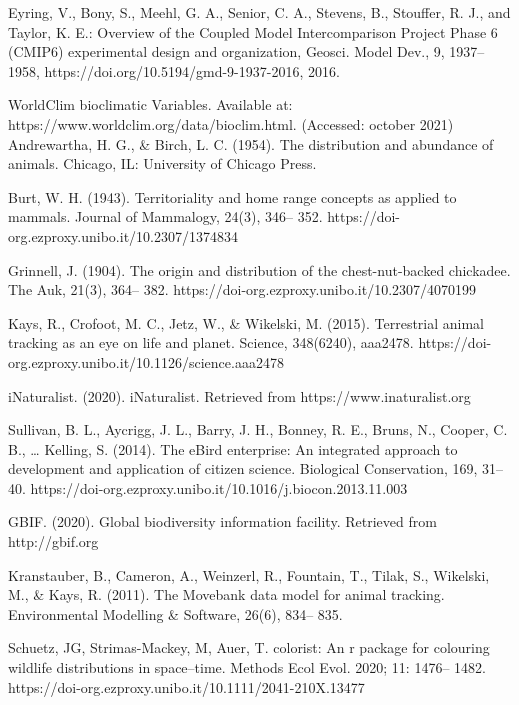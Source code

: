 \documentclass[12pt,a4paper]{article}
\begin{document}
\begin{thebibliography}{999}
Eyring, V., Bony, S., Meehl, G. A., Senior, C. A., Stevens, B., Stouffer, R. J., and Taylor, K. E.: Overview of the Coupled Model Intercomparison Project Phase 6 (CMIP6) experimental design and organization, Geosci. Model Dev., 9, 1937–1958, https://doi.org/10.5194/gmd-9-1937-2016, 2016.

WorldClim bioclimatic Variables. Available at: https://www.worldclim.org/data/bioclim.html. (Accessed: october 2021)
Andrewartha, H. G., \& Birch, L. C. (1954). The distribution and abundance of animals. Chicago, IL: University of Chicago Press.

Burt, W. H. (1943). Territoriality and home range concepts as applied to mammals. Journal of Mammalogy, 24(3), 346– 352. https://doi-org.ezproxy.unibo.it/10.2307/1374834

Grinnell, J. (1904). The origin and distribution of the chest-nut-backed chickadee. The Auk, 21(3), 364– 382. https://doi-org.ezproxy.unibo.it/10.2307/4070199

Kays, R., Crofoot, M. C., Jetz, W., \& Wikelski, M. (2015). Terrestrial animal tracking as an eye on life and planet. Science, 348(6240), aaa2478. https://doi-org.ezproxy.unibo.it/10.1126/science.aaa2478

iNaturalist. (2020). iNaturalist. Retrieved from https://www.inaturalist.org

Sullivan, B. L., Aycrigg, J. L., Barry, J. H., Bonney, R. E., Bruns, N., Cooper, C. B., … Kelling, S. (2014). The eBird enterprise: An integrated approach to development and application of citizen science. Biological Conservation, 169, 31– 40. https://doi-org.ezproxy.unibo.it/10.1016/j.biocon.2013.11.003

GBIF. (2020). Global biodiversity information facility. Retrieved from http://gbif.org

Kranstauber, B., Cameron, A., Weinzerl, R., Fountain, T., Tilak, S., Wikelski, M., \& Kays, R. (2011). The Movebank data model for animal tracking. Environmental Modelling & Software, 26(6), 834– 835.

Schuetz, JG, Strimas-Mackey, M, Auer, T. colorist: An r package for colouring wildlife distributions in space–time. Methods Ecol Evol. 2020; 11: 1476– 1482. https://doi-org.ezproxy.unibo.it/10.1111/2041-210X.13477


\end{thebibliography}
\end{document}

